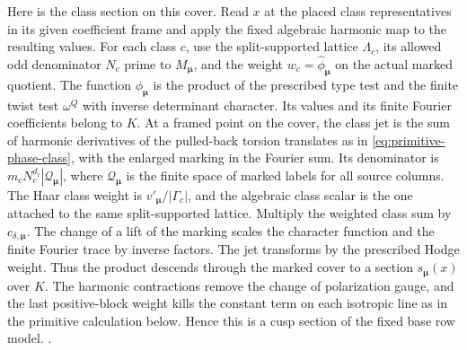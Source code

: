 Here is the class section on this cover. Read \(x\) at the
placed class representatives in its given coefficient frame
and apply the fixed algebraic harmonic map to the resulting
values. For each class \(c\), use the split-supported
lattice \(\Lambda_c\), its allowed odd denominator \(N_c\)
prime to \(M_{\boldsymbol\mu}\), and the weight
\(w_c=\widehat\phi_{\boldsymbol\mu}\) on the actual marked
quotient. The function \(\phi_{\boldsymbol\mu}\) is the
product of the prescribed type test and the finite twist test
\(\omega^Q\) with inverse determinant character.
Its values and its finite Fourier coefficients belong to \(K\).
At a framed point on the cover, the class jet is the sum of
harmonic derivatives of the pulled-back torsion translates as
in \eqref{eq:primitive-phase-class}, with the enlarged marking
in the Fourier sum. Its denominator is
\(m_cN_c^{d_i}|\mathcal Q_{\boldsymbol\mu}|\), where
\(\mathcal Q_{\boldsymbol\mu}\) is the finite space of marked
labels for all source columns. The Haar class weight is
\(v'_{\boldsymbol\mu}/|\Gamma_c|\), and the algebraic class
scalar is the one attached to the same split-supported lattice.
Multiply the weighted class sum by \(c_{\delta,\boldsymbol\mu}\).
The change of a lift of the marking scales the character
function and the finite Fourier trace by inverse factors.
The jet transforms by the prescribed Hodge weight. Thus the
product descends through the marked cover to a section
\(s_{\boldsymbol\mu}(x)\) over \(K\). The harmonic
contractions remove the change of polarization gauge, and
the last positive-block weight kills the constant term on
each isotropic line as in the primitive calculation below.
Hence this is a cusp section of the fixed base row model.
.

